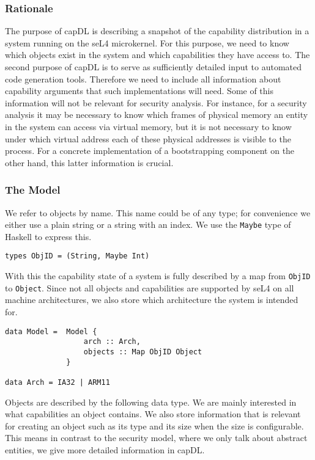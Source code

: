 \documentclass[a4paper,11pt]{article}
\begin{document}
\subsubsection{Rationale}
The purpose of capDL is describing a snapshot of the capability distribution in 
a system running on the seL4 microkernel. For this purpose, we need to know 
which objects exist in the system and which capabilities they have access to. 
The second purpose of capDL is to serve as sufficiently detailed input to 
automated code generation tools. Therefore we need to include all information 
about capability arguments that such implementations will need. Some of this 
information will not be relevant for security analysis. For instance, for a 
security analysis it may be necessary to know which frames of physical memory 
an entity in the system can access via virtual memory, but it is not necessary 
to know under which virtual address each of these physical addresses is visible 
to the process. For a concrete implementation of a bootstrapping component on 
the other hand, this latter information is crucial.

\subsubsection{The Model}
We refer to objects by name. This name could be of any type; for convenience we either use a plain string or a string with an index. We use the \texttt{Maybe} type of Haskell to express this. 

\begin{verbatim}
types ObjID = (String, Maybe Int)
\end{verbatim}

With this the capability state of a system is fully described by a map from \texttt{ObjID} to \texttt{Object}. Since not all objects and capabilities are supported by seL4 on all machine architectures, we also store which architecture the system is intended for.

\begin{verbatim}
data Model =  Model {
                  arch :: Arch,
                  objects :: Map ObjID Object
              } 

data Arch = IA32 | ARM11
\end{verbatim}

Objects are described by the following data type. We are mainly interested in what capabilities an object contains. We also store information that is relevant for creating an object such as its type and its size when the size is configurable. This means in contrast to the security model, where we only talk about abstract entities, we give more detailed information in capDL.
\end{document}
